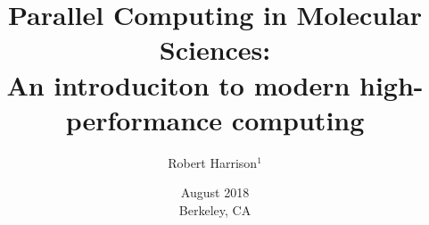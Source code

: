 \documentclass[11pt]{beamer}
\title[MolSSI]{
Parallel Computing in Molecular Sciences: \\
An introduciton to modern high-performance computing
}
\author[]{
Robert Harrison$^1$ 
}
\institute[]{
$^1$ Stony Brook University 
}
\date[August 2018]{August 2018 \\ Berkeley, CA}
\begin{document}
\frame{\titlepage}


\end{document}
